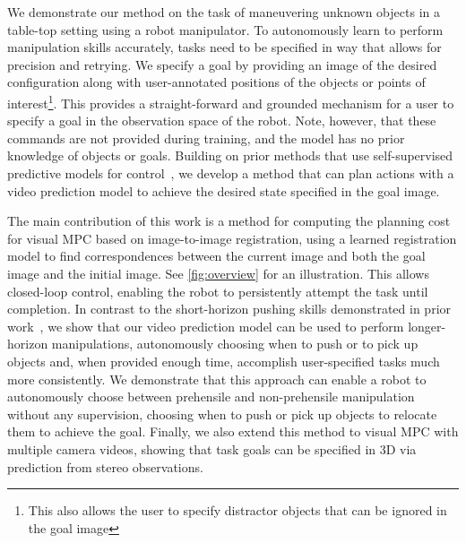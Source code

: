 We demonstrate our method on the task of maneuvering unknown objects in a table-top setting using a robot manipulator. To autonomously learn to perform manipulation skills accurately, tasks need to be specified in way that allows for precision and retrying. We specify a goal by providing an image of the desired configuration along with user-annotated positions of the objects or points of interest\footnote{This also allows the user to specify distractor objects that can be ignored in the goal image}. This provides a straight-forward and grounded mechanism for a user to specify a goal in the observation space of the robot. Note, however, that these commands are not provided during training, and the model has no prior knowledge of objects or goals.
Building on prior methods that use self-supervised predictive models for control~\cite{foresight,sna,se3_control}, we develop a method that can plan actions with a video prediction model to achieve the desired state specified in the goal image.

The main contribution of this work is a method for computing the planning cost for visual MPC based on image-to-image registration, using a learned registration model to find correspondences  between the current image and both the goal image and the initial image. See \autoref{fig:overview} for an illustration.
This allows closed-loop control, enabling the robot to persistently attempt the task until completion. In contrast to the short-horizon pushing skills demonstrated in prior work~\cite{foresight,sna}, we show that our video prediction model can be used to perform longer-horizon manipulations, autonomously choosing when to push or to  pick up objects and, when provided enough time, accomplish user-specified tasks much more consistently. We demonstrate that this approach can enable a robot to autonomously choose between prehensile and non-prehensile manipulation without any supervision, choosing when to push or pick up objects to relocate them to achieve the goal. Finally, we also extend this method to visual MPC with multiple camera videos, showing that task goals can be specified in 3D via prediction from stereo observations.

